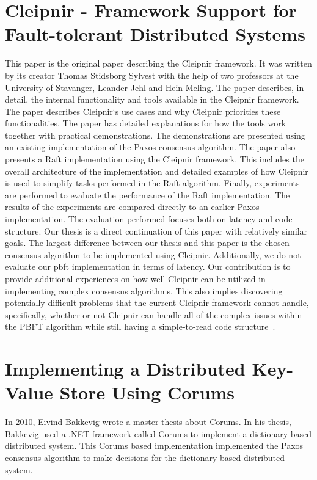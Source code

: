 \section{Cleipnir - Framework Support for Fault-tolerant Distributed Systems}
This paper is the original paper describing the Cleipnir framework. It was written by its creator Thomas Stidsborg Sylvest with the help of two professors at the University of Stavanger, Leander Jehl and Hein Meling. The paper describes, in detail, the internal functionality and tools available in the Cleipnir framework. The paper describes Cleipnir`s use cases and why Cleipnir priorities these functionalities. The paper has detailed explanations for how the tools work together with practical demonstrations. The demonstrations are presented using an existing implementation of the Paxos consensus algorithm. The paper also presents a Raft implementation using the Cleipnir framework. This includes the overall architecture of the implementation and detailed examples of how Cleipnir is used to simplify tasks performed in the Raft algorithm. Finally, experiments are performed to evaluate the performance of the Raft implementation. The results of the experiments are compared directly to an earlier Paxos implementation. The evaluation performed focuses both on latency and code structure. Our thesis is a direct continuation of this paper with relatively similar goals. The largest difference between our thesis and this paper is the chosen consensus algorithm to be implemented using Cleipnir.
Additionally, we do not evaluate our \ac{pbft} implementation in terms of latency. Our contribution is to provide additional experiences on how well Cleipnir can be utilized in implementing complex consensus algorithms. This also implies discovering potentially difficult problems that the current Cleipnir framework cannot handle, specifically, whether or not Cleipnir can handle all of the complex issues within the PBFT algorithm while still having a simple-to-read code structure~\cite{PAPER:PaxosCleipnir}.
 
\section{Implementing a Distributed Key-Value Store Using Corums}
In 2010, Eivind Bakkevig wrote a master thesis about Corums. In his thesis, Bakkevig used a .NET framework called Corums to implement a dictionary-based distributed system. This Corums based implementation implemented the Paxos consensus algorithm to make decisions for the dictionary-based distributed system.
 
